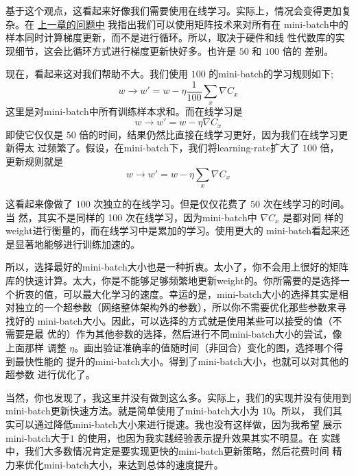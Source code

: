 基于这个观点，这看起来好像我们需要使用在线学习。实际上，情况会变得更加复杂。在%
\hyperref[ch:]{上一章的问题中} 我指出我们可以使用矩阵技术来对所有在
\gls*{mini-batch}中的样本同时计算梯度更新，而不是进行循环。所以，取决于硬件和线
性代数库的实现细节，这会比循环方式进行梯度更新快好多。也许是 $50$ 和 $100$ 倍的
差别。

现在，看起来这对我们帮助不大。我们使用 $100$ 的\gls*{mini-batch}的学习规则如下;
\begin{equation}
  w \rightarrow w' = w-\eta \frac{1}{100} \sum_x \nabla C_x
  \label{eq:100}\tag{100}
\end{equation}
这里是对\gls*{mini-batch}中所有训练样本求和。而在线学习是
\begin{equation}
  w \rightarrow w' = w-\eta \nabla C_x
  \label{eq:101}\tag{101}
\end{equation}
即使它仅仅是 $50$ 倍的时间，结果仍然比直接在线学习更好，因为我们在线学习更新得太
过频繁了。假设，在\gls*{mini-batch}下，我们将\gls*{learning-rate}扩大了 $100$ 倍，
更新规则就是
\begin{equation}
  w \rightarrow w' = w-\eta \sum_x \nabla C_x
  \label{eq:102}\tag{102}
\end{equation}

这看起来像做了 $100$ 次独立的在线学习。但是仅仅花费了 $50$ 次在线学习的时间。当
然，其实不是同样的 100 次在线学习，因为\gls*{mini-batch}中 $\nabla C_x$ 是都对同
样的\gls*{weight}进行衡量的，而在线学习中是累加的学习。使用更大的%
\gls*{mini-batch}看起来还是显著地能够进行训练加速的。

所以，选择最好的\gls*{mini-batch}大小也是一种折衷。太小了，你不会用上很好的矩阵
库的快速计算。太大，你是不能够足够频繁地更新\gls*{weight}的。你所需要的是选择一
个折衷的值，可以最大化学习的速度。幸运的是，\gls*{mini-batch}大小的选择其实是相
对独立的一个超参数（网络整体架构外的参数），所以你不需要优化那些参数来寻找好的%
\gls*{mini-batch}大小。因此，可以选择的方式就是使用某些可以接受的值（不需要是最
  优的）作为其他参数的选择，然后进行不同\gls*{mini-batch}大小的尝试，像上面那样
调整 $\eta$。画出验证准确率的值随时间（非回合）变化的图，选择哪个得到最快性能的
提升的\gls*{mini-batch}大小。得到了\gls*{mini-batch}大小，也就可以对其他的超参数
进行优化了。

当然，你也发现了，我这里并没有做到这么多。实际上，我们的实现并没有使用到%
\gls*{mini-batch}更新快速方法。就是简单使用了\gls*{mini-batch}大小为 $10$。所以，
我们其实可以通过降低\gls*{mini-batch}大小来进行提速。我也没有这样做，因为我希望
展示\gls*{mini-batch}大于$1$ 的使用，也因为我实践经验表示提升效果其实不明显。在
实践中，我们大多数情况肯定是要实现更快的\gls*{mini-batch}更新策略，然后花费时间
精力来优化\gls*{mini-batch}大小，来达到总体的速度提升。\\

